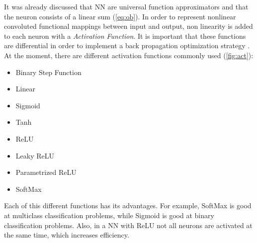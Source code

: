 It was already discussed that NN are universal function approximators and that the neuron consists of a linear sum (\cref{eq:ob}). In order to represent nonlinear convoluted functional mappings between input and output, non linearity is added to each neuron with a \emph{Activation Function}. It is important that these functions are differential in order to implement a back propagation optimization strategy \cite{sharma2017activation}. \\
At the moment, there are different activation functions commonly used (\cref{fig:act}):
\begin{itemize}
	\item Binary Step Function
	\item Linear
	\item Sigmoid
	\item Tanh
	\item ReLU
	\item Leaky ReLU
	\item Parametrized ReLU
	\item SoftMax
\end{itemize} 
Each of this different functions has its advantages. For example, SoftMax is good at multiclass classification problems, while Sigmoid is good at binary classification problems. Also, in a NN with ReLU not all neurons are activated at the same time, which increases efficiency.

\newpage

